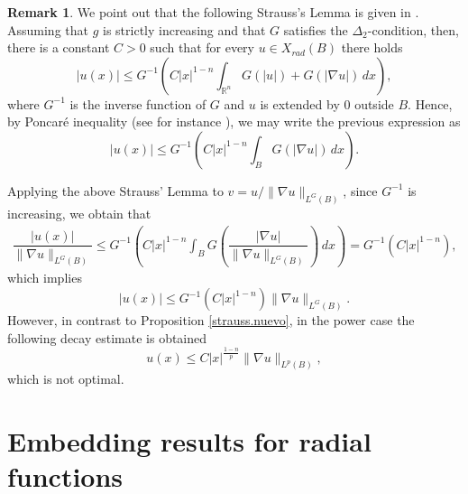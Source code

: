 \documentclass[leqno,twoside, 12pt]{amsart}
\theoremstyle{plain}
\numberwithin{equation}{section} \numberwithin{figure}{section}
\theoremstyle{definition}
\newtheorem{remark}[theorem]{Remark}
\numberwithin{equation}{section}
\begin{document}
\begin{remark}
We point out that the following Strauss's Lemma is given in \cite{AFS}. Assuming that $g$ is strictly increasing and that $G$ satisfies the $\Delta_2$-condition, then, there is a constant $C>0$ such that for every $u\in X_{rad}(B)$ there holds
\begin{equation*}
|u(x)|\leq G^{-1}\left(C|x|^{1-n}\int_{\mathbb{R}^n}G(|u|)+G(|\nabla u|)\,dx\right),
\end{equation*}
where $G^{-1}$ is the inverse function of $G$ and $u$ is extended by $0$ outside $B$. Hence,  by Poncar\'e inequality (see for instance \cite[Lemma 2.4]{FO}), we may write the previous expression as
\begin{equation*} %
|u(x)|\leq G^{-1}\left(C|x|^{1-n}\int_{B}G(|\nabla u|)\,dx\right).
\end{equation*}

Applying the above Strauss' Lemma to 
$v=u/\|\nabla u\|_{L^G(B)}$, since $G^{-1}$  is  increasing, we obtain that
\begin{equation*}
\begin{split}
\dfrac{|u(x)|}{\|\nabla u\|_{L^{G}(B)}} \leq G^{-1}\left(C|x|^{1-n}\int_{B}G\left(\dfrac{|\nabla u|}{\|\nabla u\|_{L^G(B)}}\right)\,dx\right)= G^{-1}\left(C|x|^{1-n} \right),
\end{split}
\end{equation*}
which implies
\begin{equation*}\label{radial}
|u(x)|\leq G^{-1}\left(C|x|^{1-n} \right)\|\nabla u\|_{L^G(B)}.
\end{equation*}
However, in contrast to Proposition \ref{strauss.nuevo}, in the power case the following decay estimate is obtained
$$
u(x)\leq C |x|^{\frac{1-n}{p}}\|\nabla u\|_{L^p(B)},
$$which is not optimal.
\end{remark}

 
\section{Embedding results for radial functions} \label{Section.embedding}
\end{document}

